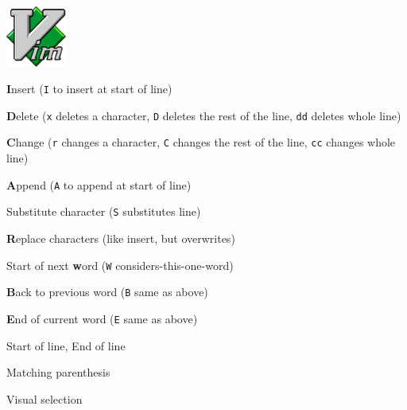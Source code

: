 \documentclass[12pt, a4paper]
{article}
\begin{document}
\pagestyle{empty}

\begin{center}
	 \hspace{1em}  \includegraphics[height=2cm]{Vim_logo}
	\vspace*{0.5em}
\end{center}

\begin{multicols}{3}
	
\begin{description}[nolistsep]
	\item[i] \textbf{I}nsert (\texttt{I} to insert at start of line)
	\item[d] \textbf{D}elete (\texttt{x} deletes a character, \texttt{D} deletes the rest of the line, \texttt{dd} deletes whole line)
	\item[c] \textbf{C}hange (\texttt{r} changes a character, \texttt{C} changes the rest of the line, \texttt{cc} changes whole line)
	\item[a] \textbf{A}ppend (\texttt{A} to append at start of line)
	\item[s] Substitute character (\texttt{S} substitutes line)
	\item[R] \textbf{R}eplace characters (like insert, but overwrites)
\end{description}


\begin{description}[nolistsep]
	\item[w] Start of next \textbf{w}ord (\texttt{W} considers-this-one-word)
	\item[b] \textbf{B}ack to previous word (\texttt{B} same as above)
	\item[e] \textbf{E}nd of current word (\texttt{E} same as above)
	\item[0, \$] Start of line, End of line
	\item[\%] Matching parenthesis
	\item[v] Visual selection
\end{description}


\end{multicols}
\end{document}
